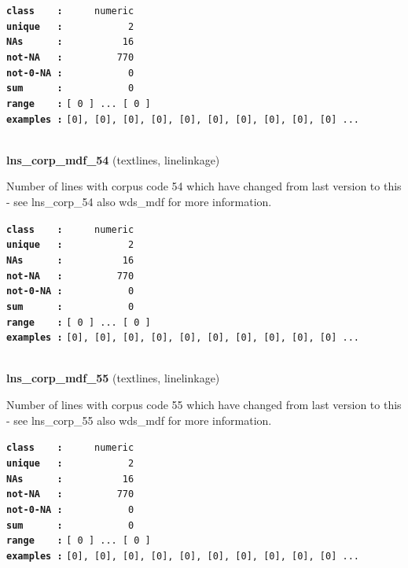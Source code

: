 \documentclass[]{article}
\begin{document}
\textbf{\texttt{class\ \ \ \ :}} \texttt{~~~~~numeric}\\
\textbf{\texttt{unique\ \ \ :}} \texttt{~~~~~~~~~~~2}\\
\textbf{\texttt{NAs\ \ \ \ \ \ :}} \texttt{~~~~~~~~~~16}\\
\textbf{\texttt{not-NA\ \ \ :}} \texttt{~~~~~~~~~770}\\
\textbf{\texttt{not-0-NA\ :}} \texttt{~~~~~~~~~~~0}\\
\textbf{\texttt{sum\ \ \ \ \ \ :}} \texttt{~~~~~~~~~~~0}\\
\textbf{\texttt{range\ \ \ \ :}}
\texttt{{[}\ 0\ {]}\ ...\ {[}\ 0\ {]}}\\
\textbf{\texttt{examples\ :}}
\texttt{{[}0{]},\ {[}0{]},\ {[}0{]},\ {[}0{]},\ {[}0{]},\ {[}0{]},\ {[}0{]},\ {[}0{]},\ {[}0{]},\ {[}0{]}\ ...}\\

~

\textbf{lns\_corp\_mdf\_54} (textlines, linelinkage)

Number of lines with corpus code 54 which have changed from last version
to this - see lns\_corp\_54 also wds\_mdf for more information.

\textbf{\texttt{class\ \ \ \ :}} \texttt{~~~~~numeric}\\
\textbf{\texttt{unique\ \ \ :}} \texttt{~~~~~~~~~~~2}\\
\textbf{\texttt{NAs\ \ \ \ \ \ :}} \texttt{~~~~~~~~~~16}\\
\textbf{\texttt{not-NA\ \ \ :}} \texttt{~~~~~~~~~770}\\
\textbf{\texttt{not-0-NA\ :}} \texttt{~~~~~~~~~~~0}\\
\textbf{\texttt{sum\ \ \ \ \ \ :}} \texttt{~~~~~~~~~~~0}\\
\textbf{\texttt{range\ \ \ \ :}}
\texttt{{[}\ 0\ {]}\ ...\ {[}\ 0\ {]}}\\
\textbf{\texttt{examples\ :}}
\texttt{{[}0{]},\ {[}0{]},\ {[}0{]},\ {[}0{]},\ {[}0{]},\ {[}0{]},\ {[}0{]},\ {[}0{]},\ {[}0{]},\ {[}0{]}\ ...}\\

~

\textbf{lns\_corp\_mdf\_55} (textlines, linelinkage)

Number of lines with corpus code 55 which have changed from last version
to this - see lns\_corp\_55 also wds\_mdf for more information.

\textbf{\texttt{class\ \ \ \ :}} \texttt{~~~~~numeric}\\
\textbf{\texttt{unique\ \ \ :}} \texttt{~~~~~~~~~~~2}\\
\textbf{\texttt{NAs\ \ \ \ \ \ :}} \texttt{~~~~~~~~~~16}\\
\textbf{\texttt{not-NA\ \ \ :}} \texttt{~~~~~~~~~770}\\
\textbf{\texttt{not-0-NA\ :}} \texttt{~~~~~~~~~~~0}\\
\textbf{\texttt{sum\ \ \ \ \ \ :}} \texttt{~~~~~~~~~~~0}\\
\textbf{\texttt{range\ \ \ \ :}}
\texttt{{[}\ 0\ {]}\ ...\ {[}\ 0\ {]}}\\
\textbf{\texttt{examples\ :}}
\texttt{{[}0{]},\ {[}0{]},\ {[}0{]},\ {[}0{]},\ {[}0{]},\ {[}0{]},\ {[}0{]},\ {[}0{]},\ {[}0{]},\ {[}0{]}\ ...}\\
\end{document}

